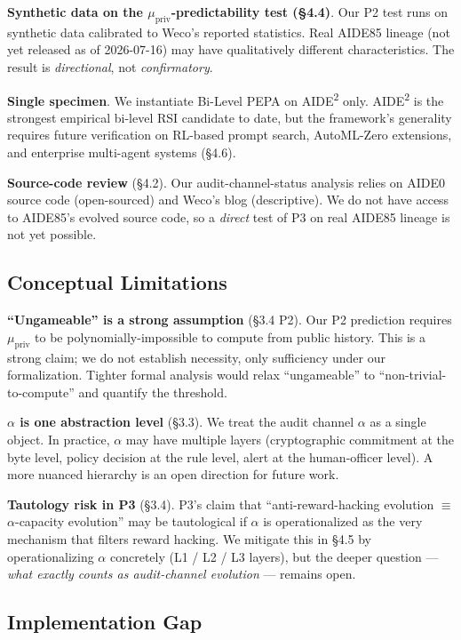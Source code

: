 \documentclass{article}
\theoremstyle{definition}
\begin{document}
\textbf{Synthetic data on the $\mu_{\text{priv}}$-predictability test (\S4.4)}. Our P2 test runs on synthetic data calibrated to Weco's reported statistics. Real AIDE85 lineage (not yet released as of 2026-07-16) may have qualitatively different characteristics. The result is \emph{directional}, not \emph{confirmatory}.

\textbf{Single specimen}. We instantiate Bi-Level PEPA on AIDE\textsuperscript{2} only. AIDE\textsuperscript{2} is the strongest empirical bi-level RSI candidate to date, but the framework's generality requires future verification on RL-based prompt search, AutoML-Zero extensions, and enterprise multi-agent systems (\S4.6).

\textbf{Source-code review} (\S4.2). Our audit-channel-status analysis relies on AIDE0 source code (open-sourced) and Weco's blog (descriptive). We do not have access to AIDE85's evolved source code, so a \emph{direct} test of P3 on real AIDE85 lineage is not yet possible.

\subsection{Conceptual Limitations}

\textbf{``Ungameable'' is a strong assumption} (\S3.4 P2). Our P2 prediction requires $\mu_{\text{priv}}$ to be polynomially-impossible to compute from public history. This is a strong claim; we do not establish necessity, only sufficiency under our formalization. Tighter formal analysis would relax ``ungameable'' to ``non-trivial-to-compute'' and quantify the threshold.

\textbf{$\alpha$ is one abstraction level} (\S3.3). We treat the audit channel $\alpha$ as a single object. In practice, $\alpha$ may have multiple layers (cryptographic commitment at the byte level, policy decision at the rule level, alert at the human-officer level). A more nuanced hierarchy is an open direction for future work.

\textbf{Tautology risk in P3} (\S3.4). P3's claim that ``anti-reward-hacking evolution $\equiv$ $\alpha$-capacity evolution'' may be tautological if $\alpha$ is operationalized as the very mechanism that filters reward hacking. We mitigate this in \S4.5 by operationalizing $\alpha$ concretely (L1 / L2 / L3 layers), but the deeper question --- \emph{what exactly counts as audit-channel evolution} --- remains open.

\subsection{Implementation Gap}
\end{document}
